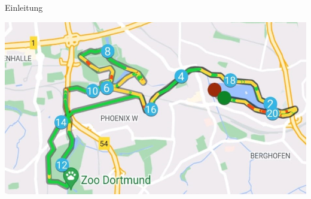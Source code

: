 \documentclass[aspectratio=169,xcolor=dvipsnames, t]{beamer}
\begin{document}
\begin{frame}{Einleitung}
\begin{minipage}[t][0.7\textheight][b]{0.48\textwidth}
{\begin{flushright}
				\end{flushright}
				\begin{flushleft}
					\includegraphics[height=0.3\textheight]{images/laufstrecke_komplex.jpg}
				\end{flushleft}}
		\end{minipage}
	\end{frame}
	
\end{document}
